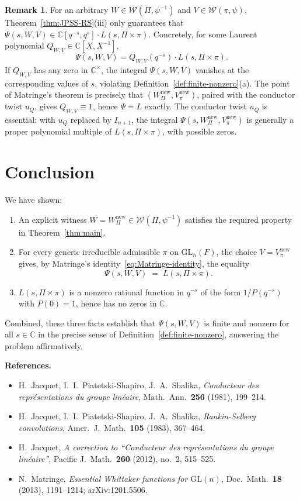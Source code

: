 \documentclass[12pt]{article}
\theoremstyle{definition}
\newtheorem{remark}[theorem]{Remark}
\begin{document}
\begin{remark}\label{rem:why-newform}
For an arbitrary $W\in\mathcal{W}(\Pi,\psi^{-1})$ and $V\in\mathcal{W}(\pi,\psi)$, Theorem~\ref{thm:JPSS-RS}(iii) only guarantees that $\Psi(s,W,V)\in\mathbb{C}[q^{-s},q^s]\cdot L(s,\Pi\times\pi)$. Concretely, for some Laurent polynomial $Q_{W,V}\in\mathbb{C}[X,X^{-1}]$,
$$\Psi(s,W,V)=Q_{W,V}(q^{-s})\cdot L(s,\Pi\times\pi).$$
If $Q_{W,V}$ has any zero in $\mathbb{C}^\times$, the integral $\Psi(s,W,V)$ vanishes at the corresponding values of $s$, violating Definition~\ref{def:finite-nonzero}(a). The point of Matringe's theorem is precisely that $(W_\Pi^{\mathrm{new}},V_\pi^{\mathrm{new}})$, paired with the conductor twist $u_Q$, gives $Q_{W,V}\equiv 1$, hence $\Psi=L$ exactly. The conductor twist $u_Q$ is essential: with $u_Q$ replaced by $I_{n+1}$, the integral $\Psi(s,W_\Pi^{\mathrm{new}},V_\pi^{\mathrm{new}})$ is generally a proper polynomial multiple of $L(s,\Pi\times\pi)$, with possible zeros.
\end{remark}

\section{Conclusion}

We have shown:
\begin{enumerate}
\item[(1)] An explicit witness $W=W_\Pi^{\mathrm{new}}\in\mathcal{W}(\Pi,\psi^{-1})$ satisfies the required property in Theorem~\ref{thm:main}.
\item[(2)] For every generic irreducible admissible $\pi$ on $\mathrm{GL}_n(F)$, the choice $V=V_\pi^{\mathrm{new}}$ gives, by Matringe's identity~\eqref{eq:Matringe-identity}, the equality
$$\Psi(s,W,V)\;=\;L(s,\Pi\times\pi).$$
\item[(3)] $L(s,\Pi\times\pi)$ is a nonzero rational function in $q^{-s}$ of the form $1/P(q^{-s})$ with $P(0)=1$, hence has no zeros in $\mathbb{C}$.
\end{enumerate}
Combined, these three facts establish that $\Psi(s,W,V)$ is finite and nonzero for all $s\in\mathbb{C}$ in the precise sense of Definition~\ref{def:finite-nonzero}, answering the problem affirmatively.

\medskip

\noindent\textbf{References.}
\begin{itemize}
\item H.\ Jacquet, I.\ I.\ Piatetski-Shapiro, J.\ A.\ Shalika, \emph{Conducteur des repr\'esentations du groupe lin\'eaire}, Math.\ Ann.\ \textbf{256} (1981), 199--214.
\item H.\ Jacquet, I.\ I.\ Piatetski-Shapiro, J.\ A.\ Shalika, \emph{Rankin-Selberg convolutions}, Amer.\ J.\ Math.\ \textbf{105} (1983), 367--464.
\item H.\ Jacquet, \emph{A correction to ``Conducteur des repr\'esentations du groupe lin\'eaire''}, Pacific J.\ Math.\ \textbf{260} (2012), no.\ 2, 515--525.
\item N.\ Matringe, \emph{Essential Whittaker functions for $\mathrm{GL}(n)$}, Doc.\ Math.\ \textbf{18} (2013), 1191--1214; arXiv:1201.5506.
\end{itemize}
\end{document}
